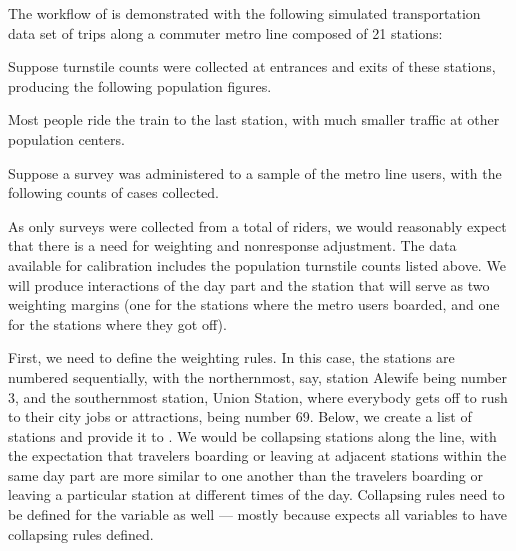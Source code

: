 The workflow of  is demonstrated with the following
simulated transportation data set of trips along a commuter metro line composed of 21 stations:

\begin{stlog}
\nullskip
\end{stlog}

Suppose turnstile counts were collected at entrances and exits of these stations,
producing the following population figures.

\label{page:station:daypart}

\noindent
\begin{stlog}
\nullskip
\end{stlog}

Most people ride the train to the last station, with much smaller traffic at other population centers.

Suppose a survey was administered to a sample of the metro line users, with the following counts
of cases collected.



\noindent
\begin{stlog}
\nullskip
\end{stlog}


As only \nullskip surveys were collected from a total of
\nullskip riders, we would reasonably expect that there is a need
for weighting and nonresponse adjustment.
The data available for calibration includes the population turnstile counts
listed above. We will produce interactions of the day part and the station that will serve as two
weighting margins (one for the stations where the metro users boarded, and one for the stations
where they got off).

First, we need to define the weighting rules. In this case, the stations are numbered sequentially,
with the northernmost, say, station Alewife being number 3, and the southernmost station,
Union Station, where everybody gets off to rush to their city jobs or attractions, being number 69.
Below, we create a list of stations and provide it to .
We would be collapsing stations along the line, with the expectation that travelers boarding or leaving
at adjacent stations within the same day part are more similar to one another than the travelers
boarding or leaving a particular station at different times of the day. Collapsing rules
need to be defined for the  variable as well --- mostly because 
expects all variables to have collapsing rules defined.

